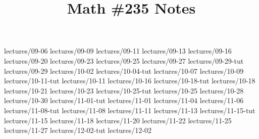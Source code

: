 \documentclass{scrartcl}
\title{Math \#235 Notes}
\begin{document}
\maketitle

\clearpage
\tableofcontents



{lectures/09-06}
{lectures/09-09}
{lectures/09-11}
{lectures/09-13}
{lectures/09-16}
{lectures/09-20}
{lectures/09-23}
{lectures/09-25}
{lectures/09-27}
{lectures/09-29-tut}
{lectures/09-29}
{lectures/10-02}
{lectures/10-04-tut}
{lectures/10-07}
{lectures/10-09}
{lectures/10-11-tut}
{lectures/10-11}
{lectures/10-16}
{lectures/10-18-tut}
{lectures/10-18}
{lectures/10-21}
{lectures/10-23}
{lectures/10-25-tut}
{lectures/10-25}
{lectures/10-28}
{lectures/10-30}
{lectures/11-01-tut}
{lectures/11-01}
{lectures/11-04}
{lectures/11-06}
{lectures/11-08-tut}
{lectures/11-08}
{lectures/11-11}
{lectures/11-13}
{lectures/11-15-tut}
{lectures/11-15}
{lectures/11-18}
{lectures/11-20}
{lectures/11-22}
{lectures/11-25}
{lectures/11-27}
{lectures/12-02-tut}
{lectures/12-02}
\end{document}
